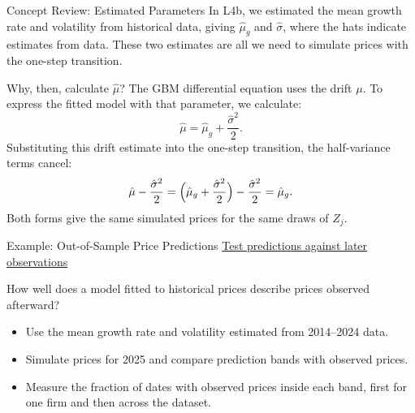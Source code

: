 \documentclass[aspectratio=169,11pt]{beamer}
\begin{document}
\begin{frame}{Concept Review: Estimated Parameters}
  In L4b, we estimated the mean growth rate and volatility from historical
  data, giving $\hat\mu_g$ and $\hat\sigma$, where the hats indicate estimates
  from data. These two estimates are all we need to simulate prices with the
  one-step transition.

  \vspace{0.4em}
  Why, then, calculate $\hat\mu$? The GBM differential equation uses the drift
  $\mu$. To express the fitted model with that parameter, we calculate:
  \[
    \boxed{\hat\mu=\hat\mu_g+\frac{\hat\sigma^2}{2}.}
  \]
  Substituting this drift estimate into the one-step transition, the
  half-variance terms cancel:
  \[
    \hat\mu-\frac{\hat\sigma^2}{2}
    =\Bigl(\hat\mu_g+\frac{\hat\sigma^2}{2}\Bigr)-\frac{\hat\sigma^2}{2}
    =\hat\mu_g.
  \]
  Both forms give the same simulated prices for the same draws of $Z_j$.
\end{frame}

\begin{frame}{Example: Out-of-Sample Price Predictions}
\textbf{}
  \href{https://github.com/varnerlab/CHEME-5660-CourseRepository-Fall-2026/blob/main/lectures/week-5/L5a/CHEME-5660-L5a-Example-OOS-SAGBM-Fall-2026.ipynb}{Test predictions against later observations}

  \vspace{0.7em}
  How well does a model fitted to historical prices describe prices
  observed afterward?

  \vspace{0.5em}
  \begin{itemize}\setlength{\itemsep}{0.6em}
    \item Use the mean growth rate and volatility estimated from 2014--2024 data.
    \item Simulate prices for 2025 and compare prediction bands with
      observed prices.
    \item Measure the fraction of dates with observed prices inside each band,
      first for one firm and then across the dataset.
  \end{itemize}

\end{frame}
\end{document}
